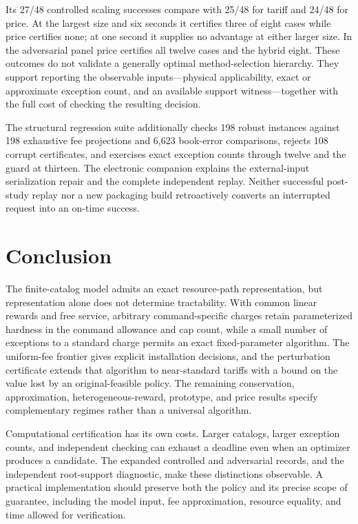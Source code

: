 \documentclass[11pt,letterpaper]{article}
\theoremstyle{definition}\newtheorem{remark}[theorem]{Remark}
\begin{document}
Its 27/48 controlled scaling successes compare with 25/48 for tariff and 24/48 for price. At the largest size and six seconds it certifies three of eight cases while price certifies none; at one second it supplies no advantage at either larger size. In the adversarial panel price certifies all twelve cases and the hybrid eight. These outcomes do not validate a generally optimal method-selection hierarchy. They support reporting the observable inputs---physical applicability, exact or approximate exception count, and an available support witness---together with the full cost of checking the resulting decision.

The structural regression suite additionally checks 198 robust instances against 198 exhaustive fee projections and 6,623 book-error comparisons, rejects 108 corrupt certificates, and exercises exact exception counts through twelve and the guard at thirteen. The electronic companion explains the external-input serialization repair and the complete independent replay. Neither successful post-study replay nor a new packaging build retroactively converts an interrupted request into an on-time success.

\section{Conclusion}\label{sec:conclusion63}
The finite-catalog model admits an exact resource-path representation, but representation alone does not determine tractability. With common linear rewards and free service, arbitrary command-specific charges retain parameterized hardness in the command allowance and cap count, while a small number of exceptions to a standard charge permits an exact fixed-parameter algorithm. The uniform-fee frontier gives explicit installation decisions, and the perturbation certificate extends that algorithm to near-standard tariffs with a bound on the value lost by an original-feasible policy. The remaining conservation, approximation, heterogeneous-reward, prototype, and price results specify complementary regimes rather than a universal algorithm.

Computational certification has its own costs. Larger catalogs, larger exception counts, and independent checking can exhaust a deadline even when an optimizer produces a candidate. The expanded controlled and adversarial records, and the independent root-support diagnostic, make these distinctions observable. A practical implementation should preserve both the policy and its precise scope of guarantee, including the model input, fee approximation, resource equality, and time allowed for verification.
\end{document}
